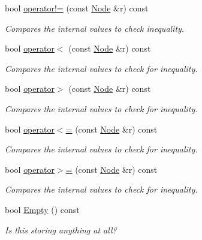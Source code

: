 \begin{DoxyCompactItemize}
bool \hyperlink{classphys_1_1xml_1_1Node_a2fdcc611f72c98bc18ef25c9be5dc8ef}{operator!=} (const \hyperlink{classphys_1_1xml_1_1Node}{Node} \&r) const 
\begin{DoxyCompactList}\small\item\em Compares the internal values to check inequality. \item\end{DoxyCompactList}\item 
bool \hyperlink{classphys_1_1xml_1_1Node_a509304b9bcc6e7891c6b4daa16168f94}{operator$<$} (const \hyperlink{classphys_1_1xml_1_1Node}{Node} \&r) const 
\begin{DoxyCompactList}\small\item\em Compares the internal values to check for inequality. \item\end{DoxyCompactList}\item 
bool \hyperlink{classphys_1_1xml_1_1Node_a7fc3bf84e390269a115e546babf89dfd}{operator$>$} (const \hyperlink{classphys_1_1xml_1_1Node}{Node} \&r) const 
\begin{DoxyCompactList}\small\item\em Compares the internal values to check for inequality. \item\end{DoxyCompactList}\item 
bool \hyperlink{classphys_1_1xml_1_1Node_a01986a425fb67bb6157aea7f861f8729}{operator$<$=} (const \hyperlink{classphys_1_1xml_1_1Node}{Node} \&r) const 
\begin{DoxyCompactList}\small\item\em Compares the internal values to check for inequality. \item\end{DoxyCompactList}\item 
bool \hyperlink{classphys_1_1xml_1_1Node_a444f80194136237ebc7c971b1c837155}{operator$>$=} (const \hyperlink{classphys_1_1xml_1_1Node}{Node} \&r) const 
\begin{DoxyCompactList}\small\item\em Compares the internal values to check for inequality. \item\end{DoxyCompactList}\item 
bool \hyperlink{classphys_1_1xml_1_1Node_a22c00132e42702d16468489ff0bd01d8}{Empty} () const 
\begin{DoxyCompactList}\small\item\em Is this storing anything at all? \item\end{DoxyCompactList}\item 

\end{DoxyCompactItemize}
